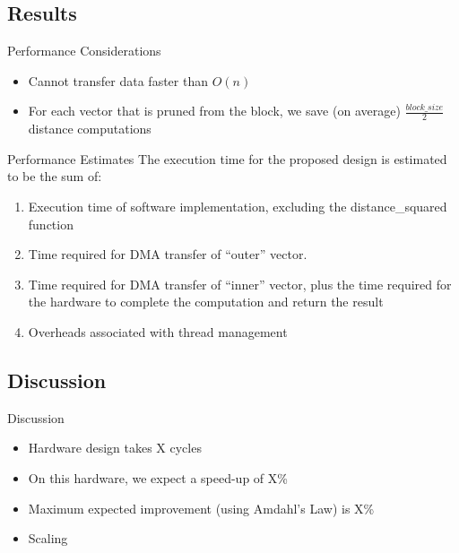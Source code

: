 \subsection{Results}
\begin{frame}[label=performance-considerations]{Performance Considerations}
    \begin{itemize}
        \item Cannot transfer data faster than $O(n)$
        \item For each vector that is pruned from the block, we save (on
            average) $\frac{block\_size}{2}$ distance computations
    \end{itemize}
\end{frame}

\begin{frame}[label=performance-estimates]{Performance Estimates}
    The execution time for the proposed design is estimated to be the sum of:
    \begin{enumerate}[<+->]
        \item Execution time of software implementation, excluding the
            distance\_squared function
        \item Time required for DMA transfer of ``outer'' vector.
        \item Time required for DMA transfer of ``inner'' vector, plus the time
            required for the hardware to complete the computation and return the
            result
        \item Overheads associated with thread management
    \end{enumerate}
\end{frame}

\subsection{Discussion}
\begin{frame}[label=discussion]{Discussion}
    \begin{itemize}
        \item Hardware design takes X cycles

        \item On this hardware, we expect a speed-up of X\%

        \item Maximum expected improvement (using Amdahl's Law) is X\%

        \item Scaling
    \end{itemize}
\end{frame}